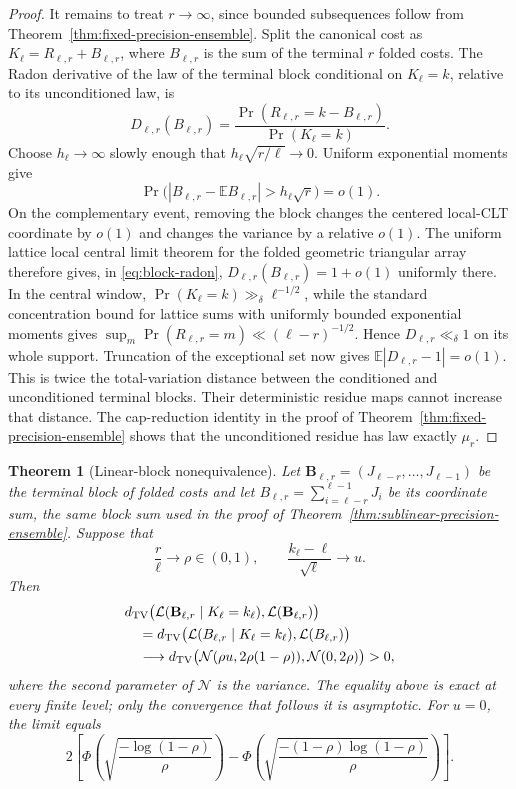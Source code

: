 \documentclass[11pt]{article}
\newtheorem{theorem}{Theorem}[section]
\theoremstyle{remark}
\begin{document}
\begin{proof}
It remains to treat $r\to\infty$, since bounded subsequences follow
from Theorem~\ref{thm:fixed-precision-ensemble}. Split the canonical
cost as $K_\ell=R_{\ell,r}+B_{\ell,r}$, where $B_{\ell,r}$ is the sum
of the terminal $r$ folded costs. The Radon derivative of the law of
the terminal block conditional on $K_\ell=k$, relative to its
unconditioned law, is
\begin{equation}\label{eq:block-radon}
 D_{\ell,r}(B_{\ell,r})
 =\frac{\Pr(R_{\ell,r}=k-B_{\ell,r})}
        {\Pr(K_\ell=k)}.
\end{equation}
Choose $h_\ell\to\infty$ slowly enough that
$h_\ell\sqrt{r/\ell}\to0$. Uniform exponential moments give
\[
 \Pr\bigl(|B_{\ell,r}-\mathbb EB_{\ell,r}|>
                 h_\ell\sqrt r\bigr)=o(1).
\]
On the complementary event, removing the block changes the centered
local-CLT coordinate by $o(1)$ and changes the variance by a relative
$o(1)$. The uniform lattice local central limit theorem for the folded
geometric triangular array therefore gives, in
\eqref{eq:block-radon}, $D_{\ell,r}(B_{\ell,r})=1+o(1)$ uniformly
there. In the central window,
$\Pr(K_\ell=k)\gg_\delta\ell^{-1/2}$, while the
standard concentration bound for lattice sums with uniformly bounded
exponential moments gives
$\sup_m\Pr(R_{\ell,r}=m)\ll(\ell-r)^{-1/2}$. Hence
$D_{\ell,r}\ll_\delta1$ on its whole support. Truncation of the
exceptional set now gives
$\mathbb E|D_{\ell,r}-1|=o(1)$. This is twice the total-variation
distance between the conditioned and unconditioned terminal blocks.
Their deterministic residue maps cannot increase that distance. The
cap-reduction identity in the proof of
Theorem~\ref{thm:fixed-precision-ensemble} shows that the unconditioned
residue has law exactly $\mu_r$.
\end{proof}

\begin{theorem}[Linear-block nonequivalence]\label{thm:linear-block-nonequivalence}
Let $\mathbf B_{\ell,r}=(J_{\ell-r},\ldots,J_{\ell-1})$ be the
terminal block of folded costs and let
$B_{\ell,r}=\sum_{i=\ell-r}^{\ell-1}J_i$ be its coordinate sum, the
same block sum used in the proof of
Theorem~\ref{thm:sublinear-precision-ensemble}. Suppose that
\[
 \frac r\ell\longrightarrow\rho\in(0,1),\qquad
 \frac{k_\ell-\ell}{\sqrt\ell}\longrightarrow u.
\]
Then
\begin{align*}
 &d_{\rm TV}\bigl(
   \mathcal L(\mathbf B_{\ell,r}\mid K_\ell=k_\ell),
   \mathcal L(\mathbf B_{\ell,r})\bigr)\\
 &\quad=d_{\rm TV}\bigl(
   \mathcal L(B_{\ell,r}\mid K_\ell=k_\ell),
   \mathcal L(B_{\ell,r})\bigr)\\
 &\quad\longrightarrow
 d_{\rm TV}\bigl(
   \mathcal N(\rho u,2\rho(1-\rho)),
   \mathcal N(0,2\rho)\bigr)>0,
\end{align*}
where the second parameter of $\mathcal N$ is the variance. The
equality above is exact at every finite level; only the convergence
that follows it is asymptotic.
For $u=0$, the limit equals
\[
 2\left[
 \Phi\left(\sqrt{\frac{-\log(1-\rho)}{\rho}}\right)
 -\Phi\left(\sqrt{\frac{-(1-\rho)\log(1-\rho)}{\rho}}\right)
 \right].
\]
\end{theorem}
\end{document}
